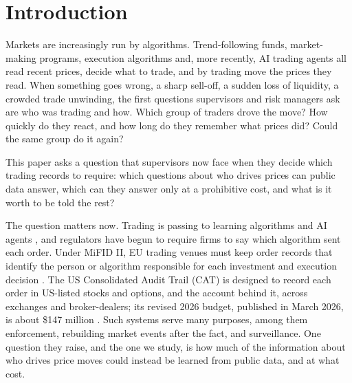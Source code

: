 \documentclass[12pt]{article}
\theoremstyle{definition}
\theoremstyle{remark}
\begin{document}
\endgroup
\newpage
\setcounter{page}{1}
\tableofcontents
\newpage

\section{Introduction}

Markets are increasingly run by algorithms. Trend-following funds, market-making programs, execution algorithms and, more recently, AI trading agents all read recent prices, decide what to trade, and by trading move the prices they read. When something goes wrong, a sharp sell-off, a sudden loss of liquidity, a crowded trade unwinding, the first questions supervisors and risk managers ask are who was trading and how. Which group of traders drove the move? How quickly do they react, and how long do they remember what prices did? Could the same group do it again?

This paper asks a question that supervisors now face when they decide which trading records to require: which questions about who drives prices can public data answer, which can they answer only at a prohibitive cost, and what is it worth to be told the rest?

The question matters now. Trading is passing to learning algorithms and AI agents \citep{colliard2022,dou2025}, and regulators have begun to require firms to say which algorithm sent each order. Under MiFID II, EU trading venues must keep order records that identify the person or algorithm responsible for each investment and execution decision \citep{rts24,esma2016}. The US Consolidated Audit Trail (CAT) is designed to record each order in US-listed stocks and options, and the account behind it, across exchanges and broker-dealers; its revised 2026 budget, published in March 2026, is about \$147 million \citep{sec2012,catbudget2026}. Such systems serve many purposes, among them enforcement, rebuilding market events after the fact, and surveillance. One question they raise, and the one we study, is how much of the information about who drives price moves could instead be learned from public data, and at what cost.
\end{document}
